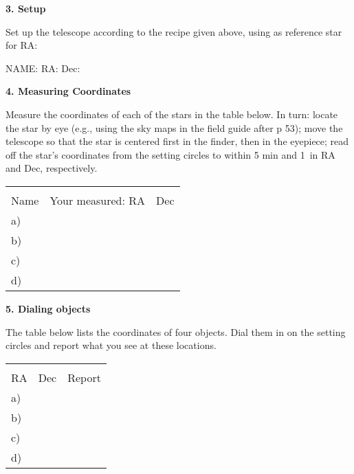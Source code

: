 \documentclass[12pt]{article}
\begin{document}
\bigskip
\noindent
{\bf 3. Setup}

\medskip\noindent
Set up the telescope according to the recipe given above, using as
reference star for RA:

\medskip\begin{center}
NAME: \makebox[2cm]{\hrulefill} RA: \makebox[2cm]{\hrulefill}  Dec: \makebox[2cm]{\hrulefill}
\end{center}

\bigskip\noindent
{\bf 4. Measuring Coordinates}

\medskip\noindent
Measure the coordinates of each of the stars in the table below. In
turn: locate the star by eye (e.g., using the sky maps in the field
guide after p 53); move the telescope so that the star is centered
first in the finder, then in the eyepiece; read off the star's
coordinates from the setting circles to within 5 min and 1\deg\ in RA
and Dec, respectively.

\begin{center}
\begin{tabular}{lcc} \hline \\ [-6pt]
\hspace{1cm}Name\hspace{1cm} &  \hspace{1cm} Your measured:  RA \hspace{1cm} & Dec \\ [6pt]
\hline
a)   & &     \\ \hline
b)   & &  \\ \hline
c)   & &    \\ \hline
d)   & &   \\ \hline
  \end{tabular}
\end{center}

\bigskip\noindent
{\bf 5. Dialing objects}

\bigskip\noindent The table below lists the coordinates of four
objects. Dial them in on the setting circles and report what you see
at these locations.


\begin{center}
\begin{tabular}{lcc} \hline \\ [-6pt]
 \hspace{1.5cm}  RA \hspace{1cm} & Dec \hspace{1cm}& \hspace{3cm}Report\hspace{3cm} \\ [6pt]
\hline
a)   & &     \\ \hline
b)   & &  \\ \hline
c)   & &    \\ \hline
d)   & &   \\ \hline
  \end{tabular}
\end{center}
\end{document}
